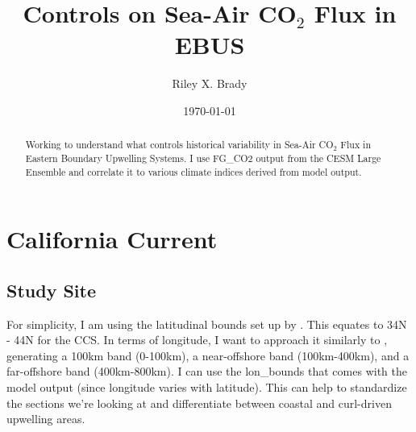 \documentclass[]{article}
\title{Controls on Sea-Air CO$_{2}$ Flux in EBUS}
\author{Riley X. Brady}
\date{\today}
\begin{document}
\maketitle
\begin{abstract}
\noindent Working to understand what controls historical variability in Sea-Air CO$_{2}$ Flux in Eastern Boundary Upwelling Systems. I use FG\_CO2 output from the CESM Large Ensemble and correlate it to various climate indices derived from model output.
\end{abstract}

\section{California Current}

\subsection{Study Site}
For simplicity, I am using the latitudinal bounds set up by \citet{Chavez:2009}. This equates to 34N - 44N for the CCS. In terms of longitude, I want to approach it similarly to \citet{Turi:2014}, generating a 100km band (0-100km), a near-offshore band (100km-400km), and a far-offshore band (400km-800km). I can use the lon\_bounds that comes with the model output (since longitude varies with latitude). This can help to standardize the sections we're looking at and differentiate between coastal and curl-driven upwelling areas.


\end{document}
